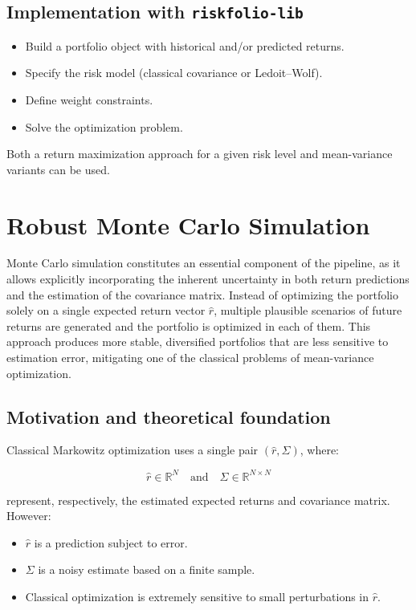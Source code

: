 \documentclass[12pt]{article}
\begin{document}
\subsection{Implementation with \texttt{riskfolio-lib}}

\begin{itemize}
    \item Build a portfolio object with historical and/or predicted returns.
    \item Specify the risk model (classical covariance or Ledoit--Wolf).
    \item Define weight constraints.
    \item Solve the optimization problem.
\end{itemize}

Both a return maximization approach for a given risk level and mean-variance variants can be used.

\section{Robust Monte Carlo Simulation}

Monte Carlo simulation constitutes an essential component of the pipeline, as it allows explicitly incorporating the inherent uncertainty in both return predictions and the estimation of the covariance matrix. Instead of optimizing the portfolio solely on a single expected return vector $\hat{r}$, multiple plausible scenarios of future returns are generated and the portfolio is optimized in each of them. This approach produces more stable, diversified portfolios that are less sensitive to estimation error, mitigating one of the classical problems of mean-variance optimization.

\subsection{Motivation and theoretical foundation}

Classical Markowitz optimization uses a single pair $(\hat{r}, \Sigma)$, where:



\[
\hat{r} \in \mathbb{R}^N \quad \text{and} \quad \Sigma \in \mathbb{R}^{N \times N}
\]



represent, respectively, the estimated expected returns and covariance matrix.  
However:

\begin{itemize}
    \item $\hat{r}$ is a prediction subject to error.
    \item $\Sigma$ is a noisy estimate based on a finite sample.
    \item Classical optimization is extremely sensitive to small perturbations in $\hat{r}$.
\end{itemize}
\end{document}
